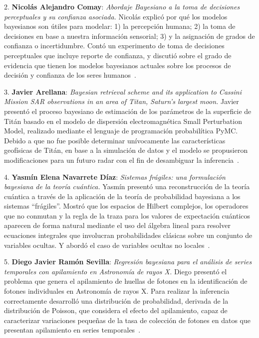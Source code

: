 \documentclass[a4paper,11pt]{book}
\theoremstyle{definition}
\begin{document}

\hspace{0.6cm} 2. \textbf{Nicolás Alejandro Comay}: \emph{Abordaje Bayesiano a la toma de decisiones perceptuales y su confianza asociada.}
%
Nicolás explicó por qué los modelos bayesianos son útiles para modelar: 1) la percepción humana; 2) la toma de decisiones en base a nuestra información sensorial; 3) y la asignación de grados de confianza o incertidumbre.
%
Contó un experimento de toma de decisiones perceptuales que incluye reporte de confianza, y discutió sobre el grado de evidencia que tienen los modelos bayesianos actuales sobre los procesos de decisión y confianza de los seres humanos~\cite{Comay2023}.


\hspace{0.6cm} 3. \textbf{Javier Arellana}: \emph{Bayesian retrieval scheme and its application to Cassini Mission SAR observations in an area of Titan, Saturn's largest moon.}
%
Javier presentó el proceso bayesiano de estimación de los parámetros de la superficie de Titán basado en el modelo de dispersión electromagnética Small Perturbation Model, realizado mediante el lenguaje de programación probabilítica PyMC.
%
Debido a que no fue posible determinar unívocamente las características geofísicas de Titán, en base a la simulación de datos y el modelo se propusieron modificaciones para un futuro radar con el fin de desambiguar la inferencia~\cite{Grings2021, Arellana2023}.


\hspace{0.6cm} 4. \textbf{Yasmín Elena Navarrete Díaz}: \emph{Sistemas frágiles: una formulación bayesiana de la teoría cuántica.}
%
Yasmín presentó una reconstrucción de la teoría cuántica a través de la aplicación de la teoría de probabilidad bayesiana a los sistemas ``frágiles''.
%
Mostró que los espacios de Hilbert complejos, los operadores que no conmutan y la regla de la traza para los valores de expectación cuánticos aparecen de forma natural mediante el uso del álgebra lineal para resolver ecuaciones integrales que involucran probabilidades clásicas sobre un conjunto de variables ocultas.
%
Y abordó el caso de variables ocultas no locales~\cite{Navarrete2016, Navarrete2023}.

\hspace{0.6cm} 5. \textbf{Diego Javier Ramón Sevilla}: \emph{Regresión bayesiana para el análisis de series temporales con apilamiento en Astronomía de rayos X.}
%
Diego presentó el problema que genera el apilamiento de huellas de fotones en la identificación de fotones individuales en Astronomía de rayos X.
%
Para realizar la inferencia correctamente desarrolló una distribución de probabilidad, derivada de la distribución de Poisson, que considera el efecto del apilamiento, capaz de caracterizar variaciones pequeñas de la tasa de colección de fotones en datos que presentan apilamiento en series temporales~\cite{Sevilla2017}.
\end{document}
